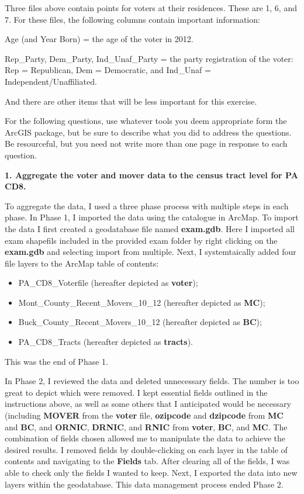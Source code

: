 \documentclass[12pt]{article}
\begin{document}
\noindent Three files above contain points for voters at their residences.  These are 1, 6, and 7.  For these files, the following columns contain important information:

\noindent Age (and Year Born) = the age of the voter in 2012.

\noindent Rep\_Party, Dem\_Party, Ind\_Unaf\_Party = the party registration of the voter:  Rep = Republican, Dem = Democratic, and Ind\_Unaf = Independent/Unaffiliated.

\noindent And there are other items that will be less important for this exercise.
\\

\clearpage

For the following questions, use whatever tools you deem appropriate form the ArcGIS package, but be sure to describe what you did to address the questions.  Be resourceful, but you need not write more than one page in response to each question.


\noindent \textbf{1.  Aggregate the voter and mover data to the census tract level for PA CD8.}

To aggregate the data, I used a three phase process with multiple steps in each phase.  In Phase 1, I imported the data using the catalogue in ArcMap.  To import the data I first created a geodatabase file named \textbf{exam.gdb}.  Here I imported all exam shapefils included in the provided exam folder by right clicking on the \textbf{exam.gdb} and selecting import from multiple.  Next, I systemtaically added four file layers to the ArcMap table of contents:

\begin{itemize}
	\item PA\_CD8\_Voterfile (hereafter depicted as \textbf{voter}); 	
	\item Mont\_County\_Recent\_Movers\_10\_12 (hereafter depicted as \textbf{MC}); 	
	\item Buck\_County\_Recent\_Movers\_10\_12 (hereafter depicted as \textbf{BC});	
	\item PA\_CD8\_Tracts (hereafter depicted as \textbf{tracts}).  
\end{itemize}


This was the end of Phase 1. 

In Phase 2, I reviewed the data and deleted unnecessary fields.  The number is too great to depict which were removed.  I kept essential fields outlined in the instructions above, as well as some others that I anticipated would be necessary (including \textbf{MOVER} from the \textbf{voter} file, \textbf{ozipcode} and \textbf{dzipcode} from \textbf{MC} and \textbf{BC}, and \textbf{ORNIC}, \textbf{DRNIC}, and \textbf{RNIC} from \textbf{voter}, \textbf{BC}, and \textbf{MC}.  The combination of fields chosen allowed me to manipulate the data to achieve the desired results.  I removed fields by double-clicking on each layer in the table of contents and navigating to the \textbf{Fields} tab.  After clearing all of the fields, I was able to check only the fields I wanted to keep.  Next, I exported the data into new layers within the geodatabase.  This data management process ended Phase 2. 
\end{document}
